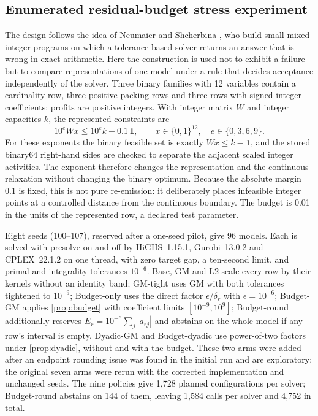 \documentclass[smallextended,envcountsect,envcountsame]{svjour3}
\begin{document}
\subsection{Enumerated residual-budget stress experiment}
\label{subsec:design-stress}
The design follows the idea of Neumaier and Shcherbina \cite{neumaier2004safe}, who build
small mixed-integer programs on which a tolerance-based solver returns an answer that is wrong
in exact arithmetic. Here the construction is used not to exhibit a failure but to compare
representations of one model under a rule that decides acceptance independently of the solver.
Three binary families with 12 variables contain a cardinality row, three positive packing rows
and three rows with signed integer coefficients; profits are positive integers. With integer
matrix $W$ and integer capacities $k$, the represented constraints are
\begin{equation}\label{eq:stress-family}
 10^e Wx\le 10^e k-0.1\,\boldsymbol 1,\qquad x\in\{0,1\}^{12},
 \quad e\in\{0,3,6,9\}.
\end{equation}
For these exponents the binary feasible set is exactly $Wx\le k-\boldsymbol 1$, and the stored
binary64 right-hand sides are checked to separate the adjacent scaled integer activities. The
exponent therefore changes the representation and the continuous relaxation without changing
the binary optimum. Because the absolute margin 0.1 is fixed, this is not pure re-emission: it
deliberately places infeasible integer points at a controlled distance from the continuous
boundary. The budget is 0.01 in the units of the represented row, a declared test parameter.

Eight seeds (100--107), reserved after a one-seed pilot, give 96 models. Each is solved with
presolve on and off by HiGHS~1.15.1, Gurobi~13.0.2 and CPLEX~22.1.2 on one thread, with zero
target gap, a
ten-second limit, and primal and integrality tolerances $10^{-6}$. Base, GM and L2 scale every
row by their kernels without an identity band; GM-tight uses GM with both tolerances tightened
to $10^{-9}$; Budget-only uses the direct factor $\epsilon/\delta_r$ with $\epsilon=10^{-6}$;
Budget-GM applies \cref{prop:budget} with coefficient limits $[10^{-9},10^9]$; Budget-round
additionally reserves $E_r=10^{-6}\sum_j|a_{rj}|$ and abstains on the whole model if any row's
interval is empty. Dyadic-GM and Budget-dyadic use power-of-two factors under
\cref{prop:dyadic}, without and with the budget. These two arms were added after an endpoint
rounding issue was found in the initial run and are exploratory; the original seven arms were
rerun with the corrected implementation and unchanged seeds. The nine policies give 1,728
planned configurations per solver; Budget-round abstains on 144 of them, leaving 1,584 calls
per solver and 4,752 in total.
\end{document}

